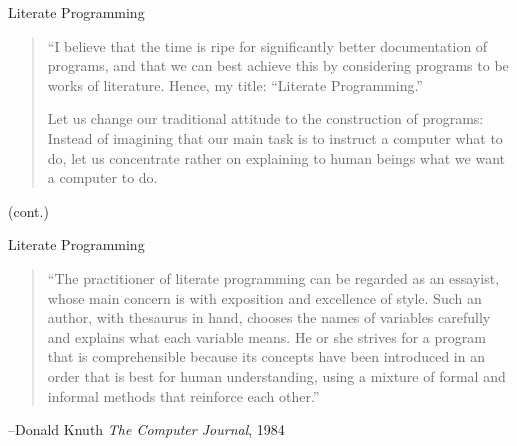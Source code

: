 \documentclass{beamer}
\begin{document}
\begin{frame}{Literate Programming}
\begin{quote}
``I believe that the time is ripe for significantly better documentation of programs, and that we can best achieve this by considering programs to be works of literature. Hence, my title: ``Literate Programming.''

Let us change our traditional attitude to the construction of programs: Instead of imagining that our main task is to instruct a computer what to do, let us concentrate rather on explaining to human beings what we want a computer to do.
\end{quote}
(cont.)
\end{frame}

\begin{frame}{Literate Programming}
\begin{quote}
``The practitioner of literate programming can be regarded as an essayist, whose main concern is with exposition and excellence of style. Such an author, with thesaurus in hand, chooses the names of variables carefully and explains what each variable means. He or she strives for a program that is comprehensible because its concepts have been introduced in an order that is best for human understanding, using a mixture of formal and informal methods that reinforce each other.''
\end{quote}
--Donald Knuth \textit{The Computer Journal}, 1984
\href{http://www.literateprogramming.com/index.html}{}
\href{http://comjnl.oxfordjournals.org/content/27/2/97.full.pdf+html}{}
\end{frame}
\end{document}
